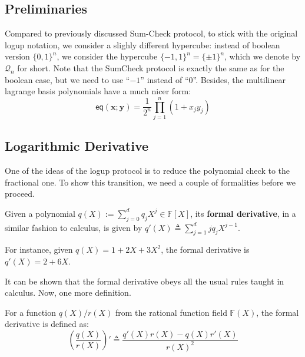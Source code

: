 \documentclass{lookup-template}
\begin{document}
\subsection*{Preliminaries}

Compared to previously discussed Sum-Check protocol, to stick with the original
logup notation, we consider a slighly different hypercube: instead of boolean
version $\{0,1\}^n$, we consider the hypercube $\{-1,1\}^n=\{\pm 1\}^n$, which
we denote by $\mathcal{Q}_n$ for short. Note that the SumCheck protocol is
exactly the same as for the boolean case, but we need to use ``$-1$'' instead of
``$0$''. Besides, the multilinear lagrange basis polynomials have a much 
nicer form:
\begin{equation*}
    \mathsf{eq}(\mathbf{x};\mathbf{y}) = \frac{1}{2^n}\prod_{j=1}^n (1+x_jy_j)
\end{equation*}

\subsection*{Logarithmic Derivative}

One of the ideas of the logup protocol is to reduce the polynomial check 
to the fractional one. To show this transition, we need a couple of formalities 
before we proceed.

\begin{definition}
    Given a polynomial $q(X) := \sum_{j=0}^d q_jX^j \in \mathbb{F}[X]$, its
    \textbf{formal derivative}, in a similar fashion to calculus, is given by
    $q'(X) \triangleq \sum_{j=1}^{d}jq_jX^{j-1}$.
\end{definition}

\begin{example}
    For instance, given $q(X)=1+2X+3X^2$, the formal derivative is $q'(X)=2+6X$.
\end{example}

It can be shown that the formal derivative obeys all the usual rules taught 
in calculus. Now, one more definition.
\begin{definition}
    For a function $q(X)/r(X)$ from the rational function field $\mathbb{F}(X)$, the 
    formal derivative is defined as:
    \begin{equation*}
        \left(\frac{q(X)}{r(X)}\right)' \triangleq \frac{q'(X)r(X)-q(X)r'(X)}{r(X)^2}
    \end{equation*}
\end{definition}
\end{document}
